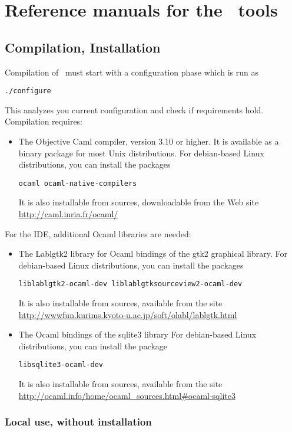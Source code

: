 \chapter{Reference manuals for the \why\ tools}
\label{chap:manpages}

\section{Compilation, Installation}
\label{sec:install}

Compilation of \why\ must start with a configuration phase which is run as
\begin{verbatim}
./configure
\end{verbatim}
This analyzes you current configuration and check if requirements hold.
Compilation requires:
\begin{itemize}
\item The Objective Caml compiler, version 3.10 or higher. It is
  available as a binary package for most Unix distributions. For
  debian-based Linux distributions, you can install the packages
\begin{verbatim}
ocaml ocaml-native-compilers
\end{verbatim}
It is also installable from sources, downloadable from the Web site
\url{http://caml.inria.fr/ocaml/}
\end{itemize}

For the IDE, additional Ocaml libraries are needed:
\begin{itemize}
\item The Lablgtk2 library for Ocaml bindings of the gtk2 graphical library.
 For debian-based Linux distributions, you can install the packages
\begin{verbatim}
liblablgtk2-ocaml-dev liblablgtksourceview2-ocaml-dev
\end{verbatim}
It is also installable from sources, available from the site \url{http://wwwfun.kurims.kyoto-u.ac.jp/soft/olabl/lablgtk.html}

\item The Ocaml bindings of the sqlite3 library
For debian-based Linux distributions, you can install the package
\begin{verbatim}
libsqlite3-ocaml-dev
\end{verbatim}
It is also installable from sources, available from the site
\url{http://ocaml.info/home/ocaml_sources.html#ocaml-sqlite3}
\end{itemize}

\subsection{Local use, without installation}

